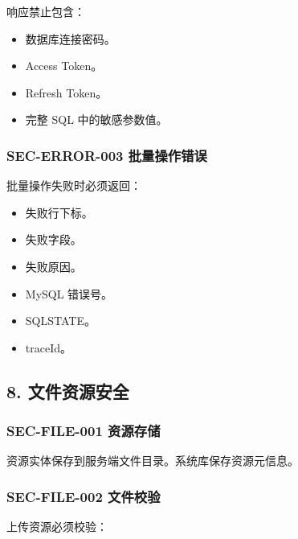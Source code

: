 \documentclass[
  a4paper,
  UTF8]{ctexart}
\providecommand{\tightlist}{%
  \setlength{\itemsep}{0pt}\setlength{\parskip}{0pt}}
\begin{document}
响应禁止包含：

\begin{itemize}
\tightlist
\item
  数据库连接密码。
\item
  Access Token。
\item
  Refresh Token。
\item
  完整 SQL 中的敏感参数值。
\end{itemize}

\hypertarget{sec-error-003-ux6279ux91cfux64cdux4f5cux9519ux8bef}{%
\subsubsection{SEC-ERROR-003
批量操作错误}\label{sec-error-003-ux6279ux91cfux64cdux4f5cux9519ux8bef}}

批量操作失败时必须返回：

\begin{itemize}
\tightlist
\item
  失败行下标。
\item
  失败字段。
\item
  失败原因。
\item
  MySQL 错误号。
\item
  SQLSTATE。
\item
  traceId。
\end{itemize}

\hypertarget{ux6587ux4ef6ux8d44ux6e90ux5b89ux5168}{%
\subsection{8.
文件资源安全}\label{ux6587ux4ef6ux8d44ux6e90ux5b89ux5168}}

\hypertarget{sec-file-001-ux8d44ux6e90ux5b58ux50a8}{%
\subsubsection{SEC-FILE-001
资源存储}\label{sec-file-001-ux8d44ux6e90ux5b58ux50a8}}

资源实体保存到服务端文件目录。系统库保存资源元信息。

\hypertarget{sec-file-002-ux6587ux4ef6ux6821ux9a8c}{%
\subsubsection{SEC-FILE-002
文件校验}\label{sec-file-002-ux6587ux4ef6ux6821ux9a8c}}

上传资源必须校验：
\end{document}
